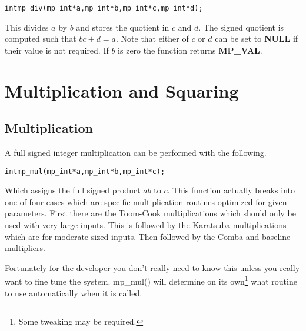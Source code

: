 \documentclass[synpaper]{book}
\begin{document}
\begin{alltt}
int mp_div (mp_int * a, mp_int * b, mp_int * c, mp_int * d);
\end{alltt}

This divides $a$ by $b$ and stores the quotient in $c$ and $d$.  The signed quotient is computed such that
$bc + d = a$.  Note that either of $c$ or $d$ can be set to \textbf{NULL} if their value is not required.  If
$b$ is zero the function returns \textbf{MP\_VAL}.


\chapter{Multiplication and Squaring}
\section{Multiplication}
A full signed integer multiplication can be performed with the following.
\begin{alltt}
int mp_mul (mp_int * a, mp_int * b, mp_int * c);
\end{alltt}
Which assigns the full signed product $ab$ to $c$.  This function actually breaks into one of four cases which are
specific multiplication routines optimized for given parameters.  First there are the Toom-Cook multiplications which
should only be used with very large inputs.  This is followed by the Karatsuba multiplications which are for moderate
sized inputs.  Then followed by the Comba and baseline multipliers.

Fortunately for the developer you don't really need to know this unless you really want to fine tune the system.  mp\_mul()
will determine on its own\footnote{Some tweaking may be required.} what routine to use automatically when it is called.
\end{document}
